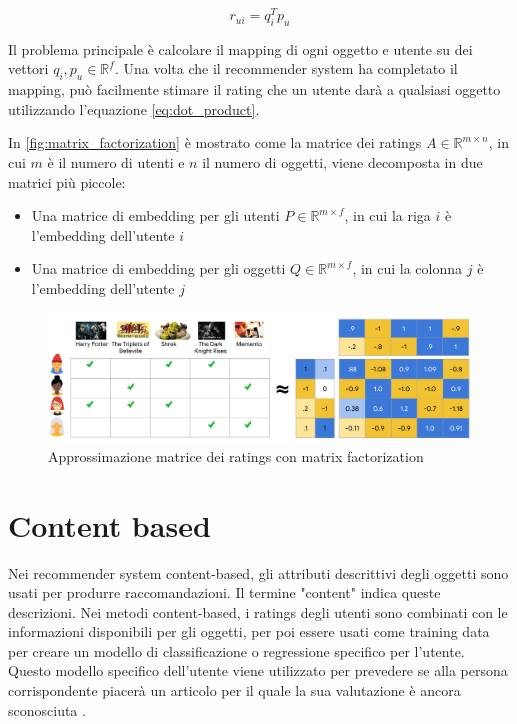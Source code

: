 \documentclass[12pt,italian]{report}
\begin{document}
\begin{equation} \label{eq:dot_product}
r_{ui} = q_i^Tp_u
\end{equation}

Il problema principale è calcolare il mapping di ogni oggetto e utente su dei vettori $q_i, p_u \in \mathbb{R}^f$. Una volta che il recommender system ha completato il mapping, può facilmente stimare il rating che un utente darà a qualsiasi oggetto utilizzando l'equazione \ref{eq:dot_product}. 

In \autoref{fig:matrix_factorization} è mostrato come la matrice dei ratings $A \in \mathbb{R}^{m \times n}$, in cui $m$ è il numero di utenti e $n$ il numero di oggetti, viene decomposta in due matrici più piccole:

\begin{itemize}
	\item Una matrice di embedding per gli utenti $P \in \mathbb{R}^{m \times f}$, in cui la riga $i$ è l'embedding dell'utente $i$
	\item Una matrice di embedding per gli oggetti $Q \in \mathbb{R}^{m \times f}$, in cui la colonna $j$ è l'embedding dell'utente $j$
\end{itemize}

\begin{figure}
  \includegraphics[width=\linewidth]{immagini/matrix_factorization.pdf}
  \caption{Approssimazione matrice dei ratings con matrix factorization}
  \label{fig:matrix_factorization}
\end{figure}

\section{Content based}
Nei recommender system content-based, gli attributi descrittivi degli oggetti sono usati per produrre raccomandazioni. Il termine "content" indica queste descrizioni. Nei metodi content-based, i ratings degli utenti sono combinati con le informazioni disponibili per gli oggetti, per poi essere usati come training data per creare un modello di classificazione o regressione specifico per l'utente. Questo modello specifico dell'utente viene utilizzato per prevedere se alla persona corrispondente piacerà un articolo per il quale la sua valutazione è ancora sconosciuta \cite{recsys-book}.
\end{document}
